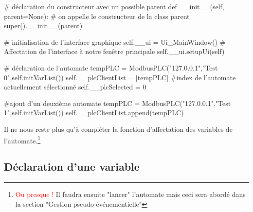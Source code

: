 \begin{pyCode}

	# déclaration du constructeur avec un possible parent
	def __init__(self, parent=None):
		# on appelle le constructeur de la class parent
		super().__init__(parent)

		# initialisation de l’interface graphique
		self.__ui = Ui_MainWindow()
		# Affectation de l’interface à notre fenêtre principale
		self.__ui.setupUi(self)

		# déclaration de l’automate
		tempPLC = ModbusPLC("127.0.0.1","Test 0",self.initVarList())
		self.__plcClientList = [tempPLC]
		#index de l'automate actuellement sélectionné
		self.__plcSelected = 0

		#ajout d'un deuxième automate
		tempPLC = ModbusPLC("127.0.0.1","Test 1",self.initVarList())
		self.__plcClientList.append(tempPLC)
\end{pyCode}

Il ne nous reste plus qu'à compléter la fonction d'affectation des variables de l'automate.\footnote{\textcolor{red}{Ou presque !} Il faudra ensuite "lancer" l'automate mais ceci sera abordé dans la section "Gestion pseudo-événementielle"}


\subsection{Déclaration d'une variable}

